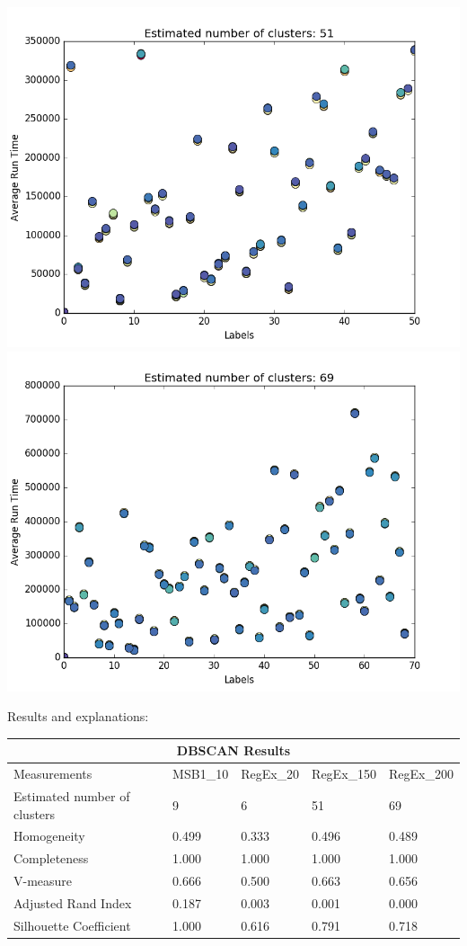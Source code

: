 \documentclass{article}
\begin{document}
    \includegraphics[scale=0.2]{RegEx_150_10_2_10011.png}
    \includegraphics[scale=0.2]{RegEx_200_10_2_101011.png}

Results and explanations:

\begin{tabular}{ |p{2cm}||p{1.8cm}|p{1.8cm}|p{1.8cm}|p{1.8cm}| }
 \hline
 \multicolumn{5}{|c|}{DBSCAN Results} \\
 \hline
 Measurements & MSB1\_10 & RegEx\_20 &RegEx\_150 & RegEx\_200\\
 \hline
 Estimated number of clusters   & 9 & 6 & 51 & 69\\
 Homogeneity & 0.499 & 0.333 &0.496 & 0.489\\
 Completeness & 1.000 & 1.000 & 1.000 & 1.000\\
 V-measure & 0.666 & 0.500 & 0.663 & 0.656\\
 Adjusted Rand Index & 0.187 & 0.003 & 0.001 & 0.000\\
 Silhouette Coefficient & 1.000 & 0.616 & 0.791 & 0.718\\
 \hline
\end{tabular}\\
\end{document}
